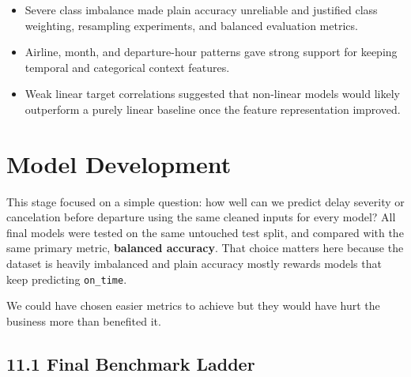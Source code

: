 \documentclass{article}
\newcommand{\code}[1]{\texttt{\small #1}}
\begin{document}
\begin{itemize}[label=\textcolor{accentblue}{\textbullet}]
    \item Severe class imbalance made plain accuracy unreliable and justified class weighting, resampling experiments, and balanced evaluation metrics.
    \item Airline, month, and departure-hour patterns gave strong support for keeping temporal and categorical context features.
    \item Weak linear target correlations suggested that non-linear models would likely outperform a purely linear baseline once the feature representation improved.
\end{itemize}


\section{\textcolor{accentblue}{Model Development}}

This stage focused on a simple question: how well can we predict delay severity or cancelation before departure using the same cleaned inputs for every model? All final models were tested on the same untouched test split, and compared with the same primary metric, \textbf{balanced accuracy}. That choice matters here because the dataset is heavily imbalanced and plain accuracy mostly rewards models that keep predicting \code{on\_time}.

We could have chosen easier metrics to achieve but they would have hurt the business more than benefited it.

\subsection*{\textcolor{accentgold}{11.1 Final Benchmark Ladder}}
\end{document}
